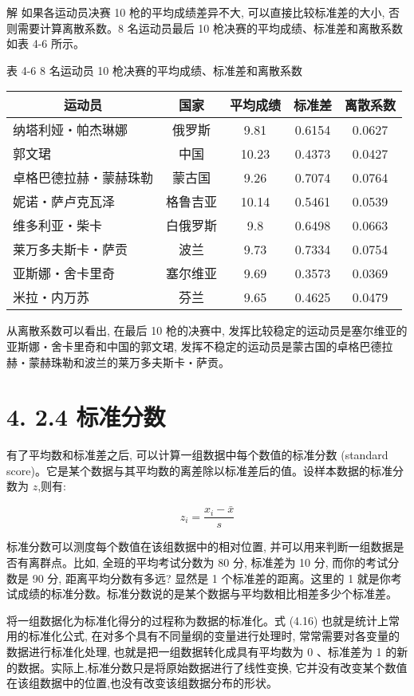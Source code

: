 \documentclass[10pt]{article}
\begin{document}
\begin{CJK*}{UTF8}{bsmi}
解 如果各运动员决赛 10 枪的平均成绩差异不大, 可以直接比较标准差的大小, 否则需要计算离散系数。8 名运动员最后 10 枪决赛的平均成绩、标准差和离散系数如表 4-6 所示。

表 4-6 8 名运动员 10 枪决赛的平均成绩、标准差和离散系数

\begin{center}
\begin{tabular}{lcccc}
\hline
\multicolumn{1}{c}{运动员} & 国家 & 平均成绩 & 标准差 & 离散系数 \\
\hline
纳塔利娅・帕杰琳娜 & 俄罗斯 & 9.81 & 0.6154 & 0.0627 \\
郭文珺 & 中国 & 10.23 & 0.4373 & 0.0427 \\
卓格巴德拉赫・蒙赫珠勒 & 蒙古国 & 9.26 & 0.7074 & 0.0764 \\
妮诺・萨卢克瓦泽 & 格鲁吉亚 & 10.14 & 0.5461 & 0.0539 \\
维多利亚・柴卡 & 白俄罗斯 & 9.8 & 0.6498 & 0.0663 \\
莱万多夫斯卡・萨贡 & 波兰 & 9.73 & 0.7334 & 0.0754 \\
亚斯娜・舍卡里奇 & 塞尔维亚 & 9.69 & 0.3573 & 0.0369 \\
米拉・内万苏 & 芬兰 & 9.65 & 0.4625 & 0.0479 \\
\hline
\end{tabular}
\end{center}

从离散系数可以看出, 在最后 10 枪的决赛中, 发挥比较稳定的运动员是塞尔维亚的亚斯娜・舍卡里奇和中国的郭文珺, 发挥不稳定的运动员是蒙古国的卓格巴德拉赫・蒙赫珠勒和波兰的莱万多夫斯卡・萨贡。

\section*{4. 2.4 标准分数}
有了平均数和标准差之后, 可以计算一组数据中每个数值的标准分数 (standard score)。它是某个数据与其平均数的离差除以标准差后的值。设样本数据的标准分数为 $z$,则有:


\begin{equation*}
z_{i}=\frac{x_{i}-\bar{x}}{s} \tag{4.16}
\end{equation*}


标准分数可以测度每个数值在该组数据中的相对位置, 并可以用来判断一组数据是否有离群点。比如, 全班的平均考试分数为 80 分, 标准差为 10 分, 而你的考试分数是 90 分, 距离平均分数有多远? 显然是 1 个标准差的距离。这里的 1 就是你考试成绩的标准分数。标准分数说的是某个数据与平均数相比相差多少个标准差。

将一组数据化为标准化得分的过程称为数据的标准化。式 (4.16) 也就是统计上常用的标准化公式, 在对多个具有不同量纲的变量进行处理时, 常常需要对各变量的数据进行标准化处理, 也就是把一组数据转化成具有平均数为 0 、标准差为 1 的新的数据。实际上,标准分数只是将原始数据进行了线性变换, 它并没有改变某个数值在该组数据中的位置,也没有改变该组数据分布的形状。


\end{CJK*}
\end{document}
